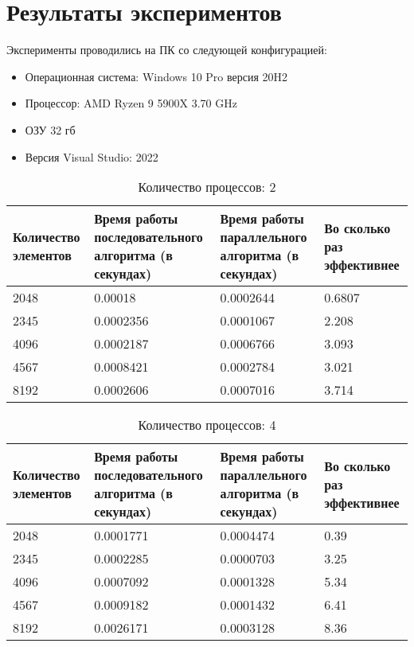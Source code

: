 \documentclass{report}
\begin{document}
\section*{Результаты экспериментов}
Эксперименты проводились на ПК со следующей конфигурацией:
\begin{itemize}
\item Операционная система: Windows 10 Pro версия 20H2
\item Процессор: AMD Ryzen 9 5900X  3.70 GHz
\item ОЗУ 32 гб
\item Версия Visual Studio: 2022
\end{itemize}
\begin{table}[h]
  \caption{Количество процессов: 2}
  \centering
\begin{tabular}{| p{2cm} | p{3cm} | p{4cm} | p{2cm} |}
\hline
Количество элементов & Время работы последовательного алгоритма (в секундах) & Время работы параллельного алгоритма (в секундах) & Во сколько раз эффективнее  \\[5pt]
\hline
2048        & 0.00018        & 0.0002644     & 0.6807      \\
2345        & 0.0002356       & 0.0001067     & 2.208       \\
4096        & 0.0002187       & 0.0006766      & 3.093       \\
4567        & 0.0008421        & 0.0002784     & 3.021      \\
8192        & 0.0002606        & 0.0007016    & 3.714       \\
\hline
\end{tabular}
\end{table}

\begin{table}[h]
  \caption{Количество процессов: 4}
  \centering
\begin{tabular}{| p{2cm} | p{3cm} | p{4cm} | p{2cm} |}
\hline
Количество элементов & Время работы последовательного алгоритма (в секундах) & Время работы параллельного алгоритма (в секундах) & Во сколько раз эффективнее  \\[5pt]
\hline
2048        & 0.0001771      & 0.0004474     & 0.39      \\
2345      & 0.0002285       & 0.0000703     & 3.25       \\
4096        & 0.0007092        & 0.0001328      & 5.34       \\
4567        & 0.0009182        & 0.0001432     & 6.41      \\
8192        & 0.0026171        & 0.0003128     & 8.36       \\
\hline
\end{tabular}
\end{table}
\end{document}
